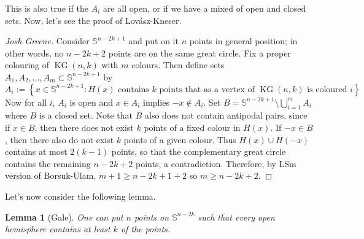 \documentclass[12pt, a4paper]{book}
\DeclareMathOperator{\KG}{KG}
\newtheorem{lemma}[theorem]{Lemma}
\theoremstyle{nonumberplain}
\newtheorem{proof}{Proof}
\begin{document}
This is also true if the $A_i$ are all open, or if we have a mixed of open and closed sets.
Now, let's see the proof of Lov\'asz-Kneser.
\begin{proof}[Josh Greene]
    Consider $\mathbb{S}^{n-2k+1}$ and put on it $n$ points in general position; in other words, no $n-2k+2$ points are on the same great circle.
    Fix a proper colouring of $\KG(n,k)$ with $m$ colours.
    Then define sets $A_1,A_2,\ldots,A_m\subset\mathbb{S}^{n-2k+1}$ by
    \begin{equation*}A_i:=\left\{x\in\mathbb{S}^{n-2k+1}:H(x)\text{ contains $k$ points that as a vertex of $\KG(n,k)$ is coloured $i$}\right\}\end{equation*}
    Now for all $i$, $A_i$ is open and $x\in A_i$ implies $-x\notin A_i$.
    Set $B=\mathbb{S}^{n-2k+1}\setminus\bigcup_{i=1}^m A_i$ where $B$ is a closed set.
    Note that $B$ also does not contain antipodal pairs, since if $x\in B$, then there does not exist $k$ points of a fixed colour in $H(x)$.
    If $-x\in B$, then there also do not exist $k$ points of a given colour.
    Thus $H(x)\cup H(-x)$ contains at most $2(k-1)$ points, so that the complementary great circle contains the remaining $n-2k+2$ points, a contradiction.
    Therefore, by LSm version of Borsuk-Ulam, $m+1\geq n-2k+1+2$ so $m\geq n-2k+2$.
\end{proof}
Let's now consider the following lemma.
\begin{lemma}[Gale]
    One can put $n$ points on $\mathbb{S}^{n-2k}$ such that every open hemisphere contains at least $k$ of the points.
\end{lemma}
\end{document}
